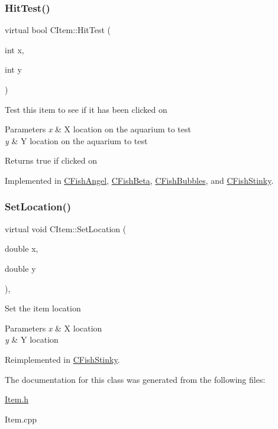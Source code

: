 \subsubsection{\texorpdfstring{HitTest()}{HitTest()}}
{\footnotesize\ttfamily virtual bool C\+Item\+::\+Hit\+Test (\begin{DoxyParamCaption}\item[{int}]{x,  }\item[{int}]{y }\end{DoxyParamCaption})\hspace{0.3cm}{\ttfamily [pure virtual]}}

Test this item to see if it has been clicked on 
\begin{DoxyParams}{Parameters}
{\em x} & X location on the aquarium to test \\
\hline
{\em y} & Y location on the aquarium to test \\
\hline
\end{DoxyParams}
\begin{DoxyReturn}{Returns}
true if clicked on 
\end{DoxyReturn}


Implemented in \mbox{\hyperlink{class_c_fish_angel_a7bc5bf0fbb87b728e4ed0ef8da8a5841}{C\+Fish\+Angel}}, \mbox{\hyperlink{class_c_fish_beta_a5bdd3d07a57ca1f01a7f2c5c00e0a662}{C\+Fish\+Beta}}, \mbox{\hyperlink{class_c_fish_bubbles_a34b8f3c613f04b7ef9a06a6fcbce5be2}{C\+Fish\+Bubbles}}, and \mbox{\hyperlink{class_c_fish_stinky_a5dadb91a76b3d573e3c6fc4e55d7ad58}{C\+Fish\+Stinky}}.

\mbox{\label{class_c_item_a5b76e510670afffe0d1da6bcc6c14547}} 
\subsubsection{\texorpdfstring{SetLocation()}{SetLocation()}}
{\footnotesize\ttfamily virtual void C\+Item\+::\+Set\+Location (\begin{DoxyParamCaption}\item[{double}]{x,  }\item[{double}]{y }\end{DoxyParamCaption})\hspace{0.3cm}{\ttfamily [inline]}, {\ttfamily [virtual]}}

Set the item location 
\begin{DoxyParams}{Parameters}
{\em x} & X location \\
\hline
{\em y} & Y location \\
\hline
\end{DoxyParams}


Reimplemented in \mbox{\hyperlink{class_c_fish_stinky_aef706c721726a98f4e98cd335af2bd00}{C\+Fish\+Stinky}}.



The documentation for this class was generated from the following files\+:\begin{DoxyCompactItemize}
\item 
\mbox{\hyperlink{_item_8h}{Item.\+h}}\item 
Item.\+cpp\end{DoxyCompactItemize}
